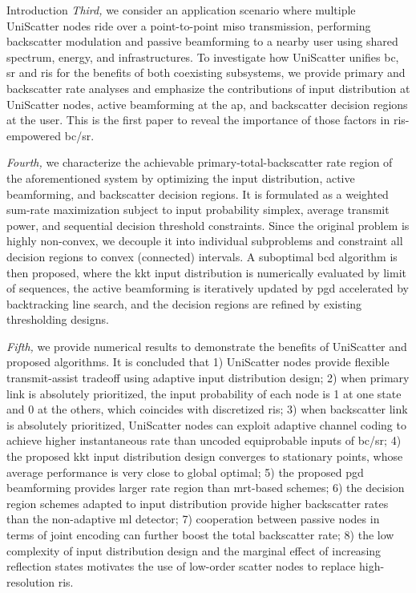 \documentclass[journal]{IEEEtran}
\begin{document}
\begin{section}{Introduction}
	\emph{Third,} we consider an application scenario where multiple UniScatter nodes ride over a point-to-point \gls{miso} transmission, performing backscatter modulation and passive beamforming to a nearby user using shared spectrum, energy, and infrastructures.
	To investigate how UniScatter unifies \gls{bc}, \gls{sr} and \gls{ris} for the benefits of both coexisting subsystems, we provide primary and backscatter rate analyses and emphasize the contributions of input distribution at UniScatter nodes, active beamforming at the \gls{ap}, and backscatter decision regions at the user.
	This is the first paper to reveal the importance of those factors in \gls{ris}-empowered \gls{bc}/\gls{sr}.

	\emph{Fourth,} we characterize the achievable primary-total-backscatter rate region of the aforementioned system by optimizing the input distribution, active beamforming, and backscatter decision regions.
	It is formulated as a weighted sum-rate maximization subject to input probability simplex, average transmit power, and sequential decision threshold constraints.
	Since the original problem is highly non-convex, we decouple it into individual subproblems and constraint all decision regions to convex (connected) intervals.
	A suboptimal \gls{bcd} algorithm is then proposed, where the \gls{kkt} input distribution is numerically evaluated by limit of sequences, the active beamforming is iteratively updated by \gls{pgd} accelerated by backtracking line search, and the decision regions are refined by existing thresholding designs.

	\emph{Fifth,} we provide numerical results to demonstrate the benefits of UniScatter and proposed algorithms.
	It is concluded that 1) UniScatter nodes provide flexible transmit-assist tradeoff using adaptive input distribution design; 2) when primary link is absolutely prioritized, the input probability of each node is \num{1} at one state and \num{0} at the others, which coincides with discretized \gls{ris}; 3) when backscatter link is absolutely prioritized, UniScatter nodes can exploit adaptive channel coding to achieve higher instantaneous rate than uncoded equiprobable inputs of \gls{bc}/\gls{sr}; 4) the proposed \gls{kkt} input distribution design converges to stationary points, whose average performance is very close to global optimal; 5) the proposed \gls{pgd} beamforming provides larger rate region than \gls{mrt}-based schemes; 6) the decision region schemes adapted to input distribution provide higher backscatter rates than the non-adaptive \gls{ml} detector; 7) cooperation between passive nodes in terms of joint encoding can further boost the total backscatter rate; 8) the low complexity of input distribution design and the marginal effect of increasing reflection states motivates the use of low-order scatter nodes to replace high-resolution \gls{ris}.


\end{section}
\end{document}
